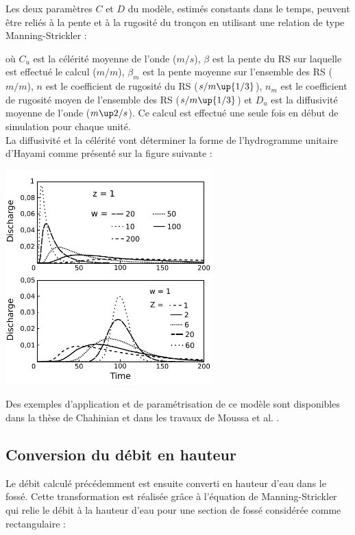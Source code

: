 Les deux paramètres $C$ et $D$ du modèle, estimés constants dans le temps, peuvent être reliés à la pente et à la rugosité du tronçon en utilisant une relation de type Manning-Strickler :



où $C_u$ est la célérité moyenne de l'onde ($m/s$), $\beta$ est la pente du RS sur laquelle est effectué le calcul ($m/m$), $\beta_m$ est la pente moyenne sur l'ensemble des RS ($m/m$), $n$ est le coefficient de rugosité du RS ($s/m\up{1/3}$), $n_m$ est le coefficient de rugosité moyen de l'ensemble des RS ($s/m\up{1/3}$) et $D_u$ est la diffusivité moyenne de l'onde ($m\up2/s$). Ce calcul est effectué une seule fois en début de simulation pour chaque unité.\\

La diffusivité et la célérité vont déterminer la forme de l'hydrogramme unitaire d'Hayami comme présenté sur la figure suivante :


\includegraphics[width=8cm]{common/Graphique_noyau_Hayami.pdf}

Des exemples d'application et de paramétrisation de ce modèle sont disponibles dans la thèse de Chahinian \cite{Chahinian2004} et dans les travaux de Moussa et al. \cite{Moussa2002}.


\subsection{Conversion du débit en hauteur}
Le débit calculé précédemment est ensuite converti en hauteur d'eau dans le fossé. Cette transformation est réalisée grâce à l'équation de Manning-Strickler qui relie le débit à la hauteur d'eau pour une section de fossé considérée comme rectangulaire :


